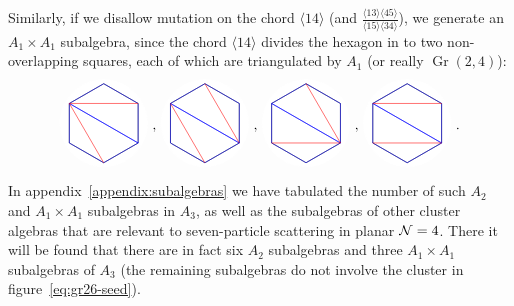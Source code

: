 \documentclass[11pt]{article}
\DeclareMathOperator{\Gr}{Gr}
\def\ket#1{\langle #1 \rangle}
\def\drawHexagon{
\coordinate (P2) at (90:1);
\coordinate (P3) at (30:1);
\coordinate (P4) at (330:1);
\coordinate (P5) at (270:1);
\coordinate (P6) at (210:1);
\coordinate (P1) at (150:1);
\draw[white,fill=white] (0,0) circle (1.1cm);
\draw (P1) -- (P2) -- (P3) -- (P4) -- (P5) -- (P6) -- cycle;
}
\begin{document}
Similarly, if we disallow mutation on the chord $\ket{14}$ (and $\frac{\ket{13}\ket{45}}{\ket{15}\ket{34}}$), we generate an $A_1 \times A_1$ subalgebra, since the chord $\ket{14}$ divides the hexagon in to two non-overlapping squares, each of which are triangulated by $A_1$ (or really $\Gr(2,4)$):
\begin{equation}
\begin{gathered}
\begin{tikzpicture}
	\drawHexagon
  	\draw[color=blue] (P1) -- (P2) -- (P3) -- (P4) -- cycle;
  	\draw[color=blue] (P1) -- (P4) -- (P5) -- (P6) -- cycle;
  	\draw[color=red] (P1) -- (P5);
  	\draw[color=red] (P1) -- (P3); 
\end{tikzpicture} 
\end{gathered}
{\ ,\ }
\begin{gathered}
\begin{tikzpicture}
  	\begin{scope}[xshift=2cm]
	\drawHexagon
  	\draw[color=blue] (P1) -- (P2) -- (P3) -- (P4) -- cycle;
  	\draw[color=blue] (P1) -- (P4) -- (P5) -- (P6) -- cycle;
  	\draw[color=red] (P1) -- (P5);
  	\draw[color=red] (P4) -- (P2);
	\end{scope}
\end{tikzpicture} 
\end{gathered}
{\ ,\ }
\begin{gathered}
\begin{tikzpicture}
	\begin{scope}[xshift=4cm]
	\drawHexagon
  	\draw[color=blue] (P1) -- (P2) -- (P3) -- (P4) -- cycle;
  	\draw[color=blue] (P1) -- (P4) -- (P5) -- (P6) -- cycle;
  	\draw[color=red] (P6) -- (P4);
  	\draw[color=red] (P4) -- (P2);
	\end{scope}
\end{tikzpicture} 
\end{gathered}
{\ ,\ }
\begin{gathered}
\begin{tikzpicture}
	\begin{scope}[xshift=6cm]
	\drawHexagon
  	\draw[color=blue] (P1) -- (P2) -- (P3) -- (P4) -- cycle;
  	\draw[color=blue] (P1) -- (P4) -- (P5) -- (P6) -- cycle;
  	\draw[color=red] (P6) -- (P4);
  	\draw[color=red] (P1) -- (P3);
	\end{scope}
\end{tikzpicture}
\end{gathered} \ .
\end{equation}
In appendix~\ref{appendix:subalgebras} we have tabulated the number of such $A_2$ and $A_1 \times A_1$ subalgebras in $A_3$, as well as the subalgebras of other cluster algebras that are relevant to seven-particle scattering in planar ${\cal N} = 4$. There it will be found that there are in fact six $A_2$ subalgebras and three $A_1 \times A_1$ subalgebras of $A_3$ (the remaining subalgebras do not involve the cluster in figure~\ref{eq:gr26-seed}).
\end{document}
